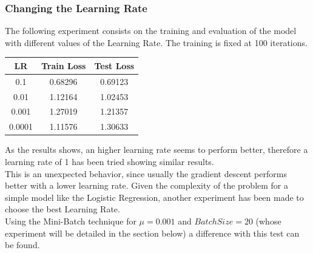 \documentclass[
	letterpaper, %
	10pt, %
]{class}
\begin{document}
\subsubsection{Changing the Learning Rate}

The following experiment consists on the training and evaluation of the model with different values of the Learning Rate. The training is fixed at 100 iterations.

\begin{center}
    \begin{tabular}{ |c|c|c| }
        \hline
        LR     & Train Loss & Test Loss \\
        \hline
        0.1    & 0.68296    & 0.69123   \\
        0.01   & 1.12164    & 1.02453   \\
        0.001  & 1.27019    & 1.21357   \\
        0.0001 & 1.11576    & 1.30633   \\
        \hline
    \end{tabular}
\end{center}

As the results shows, an higher learning rate seems to perform better, therefore a learning rate of 1 has been tried showing similar results.\\
This is an unexpected behavior, since usually the gradient descent performs better with a lower learning rate. Given the complexity of the problem for a simple model like the Logistic Regression, another experiment has been made to choose the best Learning Rate.\\

Using the Mini-Batch technique for $\mu=0.001$ and $Batch Size = 20$ (whose experiment will be detailed in the section below) a difference with this test can be found.
\end{document}
